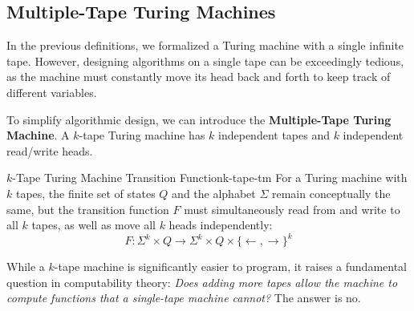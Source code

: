 \subsection{Multiple-Tape Turing Machines}
In the previous definitions, we formalized a Turing machine with a single infinite tape. However, designing algorithms on a single tape can be exceedingly tedious, as the machine must constantly move its head back and forth to keep track of different variables. 

To simplify algorithmic design, we can introduce the \textbf{Multiple-Tape Turing Machine}. A $k$-tape Turing machine has $k$ independent tapes and $k$ independent read/write heads.

\begin{definition}{$k$-Tape Turing Machine Transition Function}{k-tape-tm}
    For a Turing machine with $k$ tapes, the finite set of states $Q$ and the alphabet $\Sigma$ remain conceptually the same, but the transition function $F$ must simultaneously read from and write to all $k$ tapes, as well as move all $k$ heads independently:
    \[
        F: \Sigma^k \times Q \longrightarrow \Sigma^k \times Q \times \{\leftarrow, \rightarrow\}^k
    \]
\end{definition}

While a $k$-tape machine is significantly easier to program, it raises a fundamental question in computability theory: \textit{Does adding more tapes allow the machine to compute functions that a single-tape machine cannot?} The answer is no. 

